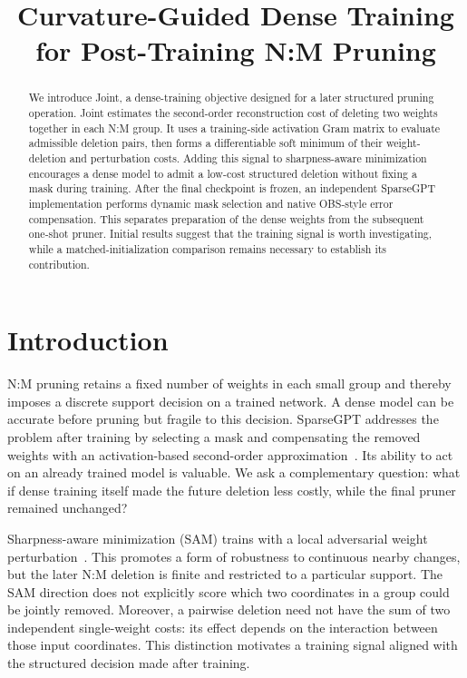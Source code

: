 \documentclass[10pt,a4paper]{article}
\title{Curvature-Guided Dense Training for Post-Training N:M Pruning}
\author{}
\date{}
\begin{document}
\maketitle

\begin{abstract}
We introduce Joint, a dense-training objective designed for a later structured pruning operation. Joint estimates the second-order reconstruction cost of deleting two weights together in each N:M group. It uses a training-side activation Gram matrix to evaluate admissible deletion pairs, then forms a differentiable soft minimum of their weight-deletion and perturbation costs. Adding this signal to sharpness-aware minimization encourages a dense model to admit a low-cost structured deletion without fixing a mask during training. After the final checkpoint is frozen, an independent SparseGPT implementation performs dynamic mask selection and native OBS-style error compensation. This separates preparation of the dense weights from the subsequent one-shot pruner. Initial results suggest that the training signal is worth investigating, while a matched-initialization comparison remains necessary to establish its contribution.
\end{abstract}

\section{Introduction}
N:M pruning retains a fixed number of weights in each small group and thereby imposes a discrete support decision on a trained network. A dense model can be accurate before pruning but fragile to this decision. SparseGPT addresses the problem after training by selecting a mask and compensating the removed weights with an activation-based second-order approximation~\cite{sparsegpt}. Its ability to act on an already trained model is valuable. We ask a complementary question: what if dense training itself made the future deletion less costly, while the final pruner remained unchanged?

Sharpness-aware minimization (SAM) trains with a local adversarial weight perturbation~\cite{sam}. This promotes a form of robustness to continuous nearby changes, but the later N:M deletion is finite and restricted to a particular support. The SAM direction does not explicitly score which two coordinates in a group could be jointly removed. Moreover, a pairwise deletion need not have the sum of two independent single-weight costs: its effect depends on the interaction between those input coordinates. This distinction motivates a training signal aligned with the structured decision made after training.
\end{document}
